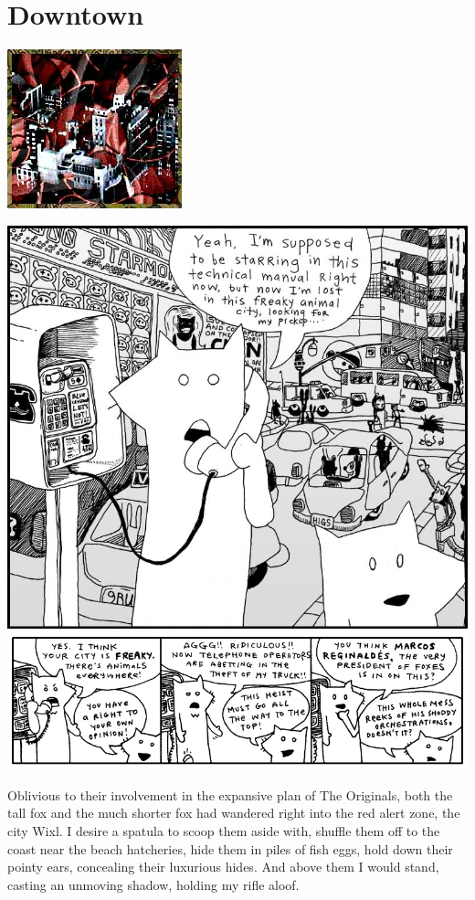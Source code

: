 \documentclass[10pt,twoside]{report}
\begin{document}
\chapter{Downtown}
\vfill
\begin{center}
  \includegraphics{cache/chapterpoignantguide6.png}
\end{center}
\vspace{2cm}
\newpage
\thispagestyle{empty}
\mbox{}
\clearpage
	\includegraphics[width=1.0\textwidth]{cache/55.png}
        \includegraphics[width=1.0\textwidth]{cache/56.png}

Oblivious to their involvement in the expansive plan of The Originals,
both the tall fox and the much shorter fox had wandered right into the
red alert zone, the city Wixl.  I desire a spatula to scoop them aside
with, shuffle them off to the coast near the beach hatcheries, hide
them in piles of fish eggs, hold down their pointy ears, concealing
their luxurious hides.  And above them I would stand, casting an
unmoving shadow, holding my rifle aloof.
\end{document}
